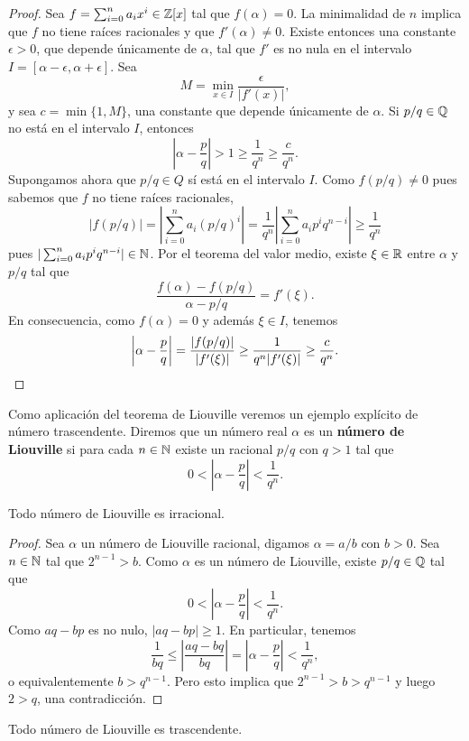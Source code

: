 \begin{proof}
	Sea	$f=\sum_{i=0}^na_ix^i\in\mathbb{Z}[x]$ tal que $f(\alpha)=0$.  La minimalidad
	de $n$ implica que $f$ no tiene raíces racionales y que $f'(\alpha)\ne 0$.
	Existe entonces una constante $\epsilon>0$, que depende únicamente de
	$\alpha$,  tal que $f'$ es no nula en el intervalo
	$I=[\alpha-\epsilon,\alpha+\epsilon]$.  Sea 
	\[
		M=\min_{x\in I}\frac{\epsilon}{|f'(x)|},
	\]
	y sea $c=\min\{1,M\}$, una constante que depende únicamente de $\alpha$. 
	Si $p/q\in\mathbb{Q}$ no está en el intervalo $I$, entonces 
	\[
		\left|\alpha-\frac{p}{q}\right|>1\geq \frac{1}{q^n}\geq\frac{c}{q^n}.
	\]
	Supongamos ahora que $p/q\in Q$ sí está en el intervalo $I$. Como 
	$f(p/q)\ne 0$ pues sabemos que $f$ no tiene raíces racionales, 
	\[
		|f(p/q)|=\left|\sum_{i=0}^na_i(p/q)^i\right|
		=\frac{1}{q^n}\left|\sum_{i=0}^na_ip^iq^{n-i}\right|\geq\frac{1}{q^n}
	\]
	pues $|\sum_{i=0}^na_ip^iq^{n-i}|\in\mathbb{N}$. Por el teorema del valor medio, existe
	$\xi\in\mathbb{R}$ entre $\alpha$ y $p/q$ tal que 
	\[
		\frac{f(\alpha)-f(p/q)}{\alpha-p/q}=f'(\xi).
	\]
	En consecuencia, como $f(\alpha)=0$ y además $\xi\in I$, tenemos  
	\[
		\left|\alpha-\frac{p}{q}\right|
		=\frac{|f(p/q)|}{|f'(\xi)|}\geq\frac{1}{q^n|f'(\xi)|}\geq\frac{c}{q^n}.\qedhere
	\]
\end{proof}

Como aplicación del teorema de Liouville veremos un ejemplo explícito de número
trascendente.  Diremos que un número real $\alpha$ es un \textbf{número de
Liouville} si para cada $n\in\mathbb{N}$ existe un racional $p/q$ con $q>1$ tal que 
\[
	0<\left|\alpha-\frac{p}{q}\right|<\frac{1}{q^n}.
\]

\begin{proposition}
	Todo número de Liouville es irracional.	
\end{proposition}

\begin{proof}
	Sea $\alpha$ un número de Liouville racional, digamos $\alpha=a/b$ con
	$b>0$. Sea $n\in\mathbb{N}$ tal que $2^{n-1}>b$. Como $\alpha$ es un número de
	Liouville, existe $p/q\in\mathbb{Q}$ tal que
	\[
		0<\left|\alpha-\frac{p}{q}\right|<\frac{1}{q^n}.
	\]
	Como $aq-bp$ es no nulo, $|aq-bp|\geq 1$. En particular, tenemos 
	\[
		\frac{1}{bq}\leq \left|\frac{aq-bq}{bq}\right|=\left|\alpha-\frac{p}{q}\right|<\frac{1}{q^n},
	\]
	o equivalentemente $b>q^{n-1}$. Pero esto implica que $2^{n-1}>b>q^{n-1}$ y
	luego $2>q$, una contradicción.
\end{proof}

\begin{proposition}
	Todo número de Liouville es trascendente.	
\end{proposition}

